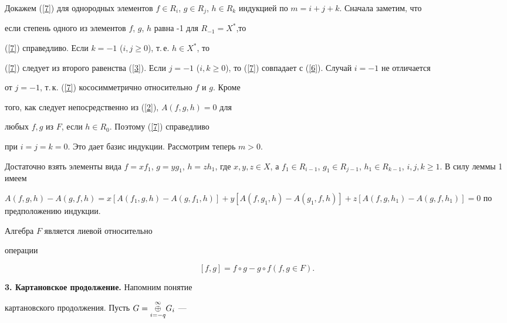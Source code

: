 \begin{pf} Докажем (\ref{7}) для однородных элементов $f \in


R_i$, $g \in R_j$, $h \in R_k$ индукцией по $m=i+j+k$. Сначала заметим, что


если степень одного из элементов $f$, $g$, $h$ равна -1 для $R_{-1}=X^*$,то 


(\ref{7}) справедливо. Если $k=-1$ ($i, j\ge 0$), т.\,е. $h \in X^*$, то 


(\ref{7}) следует из второго равенства (\ref{3}). Если $j=-1$ ($i, k\ge


0$), то (\ref{7}) совпадает с (\ref{6}). Случай $i=-1$ не отличается


от $j=-1$, т.\,к. (\ref{7}) кососимметрично относительно $f$ и $g$. Кроме


того, как следует непосредственно из (\ref{2}), $A(f,g,h) = 0$ для


любых $f, g$ из $F$, если $h \in R_0$. Поэтому (\ref{7}) справедливо


при $i=j=k=0$. Это дает базис индукции. Рассмотрим теперь $m>0$.


Достаточно взять элементы вида $f=xf_1$, $g=yg_1$, $h=zh_1$, где $x, y, z


\in X$, а $f_1 \in R_{i-1}$, $g_1 \in R_{j-1}$, $h_1 \in R_{k-1}$, $i,j,k


\ge 1$. В силу леммы 1 имеем


$A(f,g,h)-A(g,f,h)=x[A(f_1,g,h)-A(g,f_1,h)]+y[A(f,g_1,h)-A(g_1,f,h)]+


z[A(f,g,h_1)-A(g,f,h_1)]=0 $ по предположению индукции.


\end{pf}





\begin{cor} Алгебра $F$ является лиевой относительно


операции


\begin{equation}\label{8}


[f,g]=f \circ g - g \circ f   (f, g \in F).


\end{equation}


\end{cor}





{\bf 3. Картановское продолжение.} Напомним понятие


картановского продолжения. Пусть $G=\underset{i=-q}{\overset{\infty }{\oplus}}{}G_i$ ---


